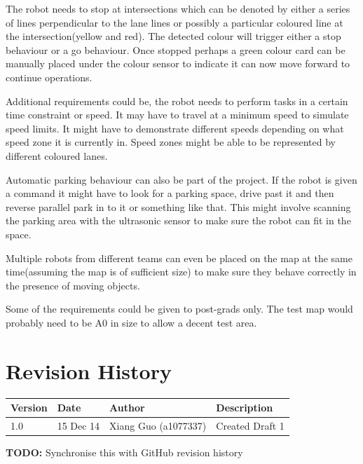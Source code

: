 \documentclass[11pt, a4paper, oneside]{article}
\begin{document}
		The robot needs to stop at intersections which can be denoted by either a series of lines perpendicular to the lane lines or possibly a particular coloured line at the intersection(yellow and red). The detected colour will trigger either a stop behaviour or a go behaviour. Once stopped perhaps a green colour card can be manually placed under the colour sensor to indicate it can now move forward to continue operations.  \newline 
		
		Additional requirements could be, the robot needs to perform tasks in a certain time constraint or speed. It may have to travel at a minimum speed to simulate speed limits. It might have to demonstrate different speeds depending on what speed zone it is currently in. Speed zones might be able to be represented by different coloured lanes.  \newline 
		
		Automatic parking behaviour can also be part of the project. If the robot is given a command it might have to look for a parking space, drive past it and then reverse parallel park in to it or something like that. This might involve scanning the parking area with the ultrasonic sensor to make sure the robot can fit in the space.  \newline 
		
		Multiple robots from different teams can even be placed on the map at the same time(assuming the map is of sufficient size) to make sure they behave correctly in the presence of moving objects.  \newline 
		
		Some of the requirements could be given to post-grads only. The test map would probably need to be A0 in size to allow a decent test area. 
		


  \section{Revision History}
  \begin{center}
  \begin{tabular}{ | l | l | l | p{4cm} |}
  \hline
  \textbf{Version} & \textbf{Date} & \textbf{Author} & \textbf{Description} \\ \hline
  1.0 & 15 Dec 14 & Xiang Guo (a1077337) & Created Draft 1 \\ \hline

  \end{tabular}
  \end{center}
  \textbf{TODO:} Synchronise this with GitHub revision history
\end{document}
